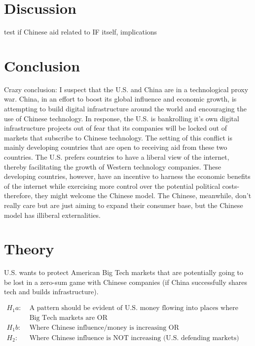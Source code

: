 \section*{Discussion}
test if Chinese aid related to IF itself, implications

\section*{Conclusion}
Crazy conclusion: I suspect that the U.S. and China are in a technological proxy war. China, in an effort to boost its global influence and economic growth, is attempting to build digital infrastructure around the world and encouraging the use of Chinese technology. In response, the U.S. is bankrolling it's own digital infrastructure projects out of fear that its companies will be locked out of markets that subscribe to Chinese technology. The setting of this conflict is mainly developing countries that are open to receiving aid from these two countries. The U.S. prefers countries to have a liberal view of the internet, thereby facilitating the growth of Western technology companies. These developing countries, however, have an incentive to harness the economic benefits of the internet while exercising more control over the potential political costs- therefore, they might welcome the Chinese model. The Chinese, meanwhile, don't really care but are just aiming to expand their consumer base, but the Chinese model has illiberal externalities.

\section*{Theory} 
U.S. wants to protect American Big Tech markets that are potentially going to be lost in a zero-sum game with Chinese companies (if China successfully shares tech and builds infrastructure).

\begin{align*}
    H_1a:\; & \text{A pattern should be evident of U.S. money flowing into places where either}\\
    & \text{Big Tech markets are OR}\\
    H_1b:\; & \text{Where Chinese influence/money is increasing OR}\\
    H_2:\; & \text{Where Chinese influence is NOT increasing (U.S. defending markets)}
\end{align*}

